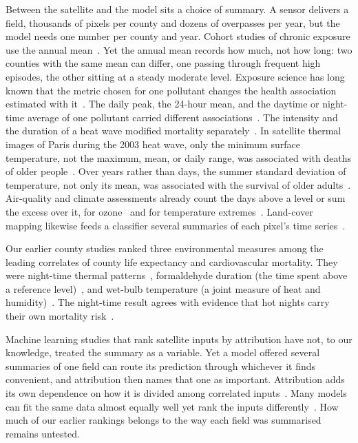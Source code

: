 \documentclass[sensors,article,submit,moreauthors,pdftex]{Definitions/mdpi}
\begin{document}
Between the satellite and the model sits a choice of summary. A sensor delivers a field, thousands of pixels per county and dozens of
overpasses per year, but the model needs one number per county and year. Cohort
studies of chronic exposure use the annual mean~\cite{Pope2020, Di2017, Burnett2018}. Yet the
annual mean records how much, not how long: two counties with the same mean
can differ, one passing through frequent high episodes, the other sitting at a
steady moderate level. Exposure science has
long known that the metric chosen for one pollutant changes the health
association estimated with it~\cite{Ozkaynak2013, Dionisio2016}. The daily
peak, the 24-hour mean, and the daytime or night-time average of one pollutant
carried different associations~\cite{Darrow2009}. The intensity and the
duration of a heat wave modified mortality separately~\cite{Anderson2010}.
In satellite thermal images of Paris during the 2003 heat wave, only the
minimum surface temperature, not the maximum, mean, or daily range, was
associated with deaths of older people~\cite{Laaidi2011}.
Over years rather than days, the summer standard deviation of temperature, not
only its mean, was associated with the survival of older
adults~\cite{Zanobetti2012, Shi2015}.
Air-quality and climate assessments already count the days above a level or
sum the excess over it, for ozone~\cite{Fleming2018} and for temperature
extremes~\cite{Zhang2011}. Land-cover mapping likewise feeds a classifier
several summaries of each pixel's time
series~\cite{Pflugmacher2019}.

Our earlier county studies ranked three environmental measures among the
leading correlates of county life expectancy and cardiovascular mortality.
They were night-time thermal
patterns~\cite{Ahmad2026night}, formaldehyde duration (the time spent above a
reference level)~\cite{Shrestha2026exp, Shrestha2026cvd}, and wet-bulb
temperature (a joint measure of heat and
humidity)~\cite{Ruwali2026multi, Shrestha2026cvd}. The night-time result agrees with evidence that hot nights carry
their own mortality risk~\cite{He2022}.

Machine learning studies that rank satellite inputs by attribution have not, to
our knowledge, treated the summary as a variable. Yet a model offered several
summaries of one field can route its prediction through whichever it finds
convenient, and attribution then names that one as important. Attribution adds
its own dependence on how it is divided among correlated
inputs~\cite{Strobl2008, Kumar2020, Janzing2020}. Many models can fit the
same data almost equally well yet rank the inputs
differently~\cite{Breiman2001two, Fisher2019}. How much of our earlier
rankings belongs to the way each field was summarised remains untested.
\end{document}
